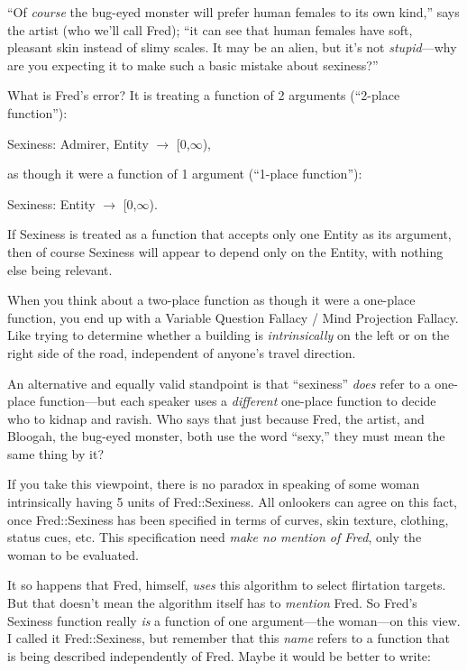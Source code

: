 {
 ``Of \textit{course} the bug-eyed monster will
prefer human females to its own kind,'' says the
artist (who we'll call Fred); ``it can
see that human females have soft, pleasant skin instead of slimy
scales. It may be an alien, but it's not
\textit{stupid}{}---why are you expecting it to make such a basic
mistake about sexiness?''}

{
 What is Fred's error? It is treating a function of
2 arguments (``2-place function''):}

{\centering
 Sexiness: Admirer, Entity $\rightarrow $ [0,${\infty}$),
\par}


\bigskip

{
 as though it were a function of 1 argument
(``1-place function''):}

{\centering
 Sexiness: Entity $\rightarrow $ [0,${\infty}$).
\par}


\bigskip

{
 If Sexiness is treated as a function that accepts only one Entity
as its argument, then of course Sexiness will appear to depend only on
the Entity, with nothing else being relevant.}

{
 When you think about a two-place function as though it were a
one-place function, you end up with a Variable Question Fallacy / Mind
Projection Fallacy. Like trying to determine whether a building is
\textit{intrinsically} on the left or on the right side of the road,
independent of anyone's travel direction.}

{
 An alternative and equally valid standpoint is that
``sexiness'' \textit{does} refer to
a one-place function---but each speaker uses a \textit{different}
one-place function to decide who to kidnap and ravish. Who says that
just because Fred, the artist, and Bloogah, the bug-eyed monster, both
use the word ``sexy,'' they must
mean the same thing by it?}

{
 If you take this viewpoint, there is no paradox in speaking of
some woman intrinsically having 5 units of Fred::Sexiness. All
onlookers can agree on this fact, once Fred::Sexiness has been
specified in terms of curves, skin texture, clothing, status cues, etc.
This specification need \textit{make no mention of Fred}, only the
woman to be evaluated.}

{
 It so happens that Fred, himself, \textit{uses} this algorithm to
select flirtation targets. But that doesn't mean the
algorithm itself has to \textit{mention} Fred. So
Fred's Sexiness function really \textit{is} a function
of one argument---the woman---on this view. I called it Fred::Sexiness,
but remember that this \textit{name} refers to a function that is being
described independently of Fred. Maybe it would be better to write:}

